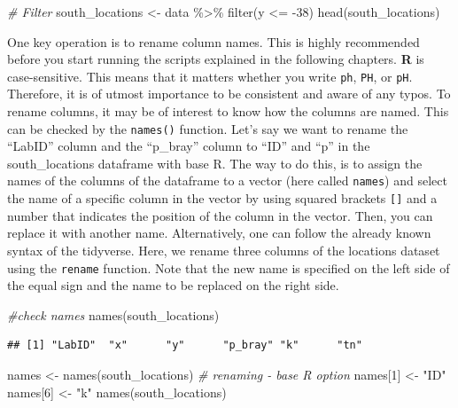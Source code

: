 \documentclass[
  10pt,
  b5paper,
  oneside]{book}
\newenvironment{Shaded}{\begin{snugshade}}{\end{snugshade}}
\newcommand{\CommentTok}[1]{\textcolor[rgb]{0.56,0.35,0.01}{\textit{#1}}}
\newcommand{\DecValTok}[1]{\textcolor[rgb]{0.00,0.00,0.81}{#1}}
\newcommand{\FunctionTok}[1]{\textcolor[rgb]{0.00,0.00,0.00}{#1}}
\newcommand{\NormalTok}[1]{#1}
\newcommand{\OtherTok}[1]{\textcolor[rgb]{0.56,0.35,0.01}{#1}}
\newcommand{\SpecialCharTok}[1]{\textcolor[rgb]{0.00,0.00,0.00}{#1}}
\newcommand{\StringTok}[1]{\textcolor[rgb]{0.31,0.60,0.02}{#1}}
\begin{document}
\begin{Shaded}
\begin{Highlighting}[]
\CommentTok{\# Filter}
\NormalTok{south\_locations }\OtherTok{\textless{}{-}}\NormalTok{ data }\SpecialCharTok{\%\textgreater{}\%} \FunctionTok{filter}\NormalTok{(y }\SpecialCharTok{\textless{}=} \SpecialCharTok{{-}}\DecValTok{38}\NormalTok{)}
\FunctionTok{head}\NormalTok{(south\_locations)}
\end{Highlighting}
\end{Shaded}

One key operation is to rename column names. This is highly recommended before you start running the scripts explained in the following chapters. \textbf{R} is case-sensitive. This means that it matters whether you write \texttt{ph}, \texttt{PH}, or \texttt{pH}. Therefore, it is of utmost importance to be consistent and aware of any typos. To rename columns, it may be of interest to know how the columns are named. This can be checked by the \texttt{names()} function.
Let's say we want to rename the ``LabID'' column and the ``p\_bray'' column to ``ID'' and ``p'' in the south\_locations dataframe with base R. The way to do this, is to assign the names of the columns of the dataframe to a vector (here called \texttt{names}) and select the name of a specific column in the vector by using squared brackets \texttt{{[}{]}} and a number that indicates the position of the column in the vector. Then, you can replace it with another name.
Alternatively, one can follow the already known syntax of the tidyverse. Here, we rename three columns of the locations dataset using the \texttt{rename} function. Note that the new name is specified on the left side of the equal sign and the name to be replaced on the right side.

\begin{Shaded}
\begin{Highlighting}[]
\CommentTok{\#check names}
\FunctionTok{names}\NormalTok{(south\_locations)}
\end{Highlighting}
\end{Shaded}

\begin{verbatim}
## [1] "LabID"  "x"      "y"      "p_bray" "k"      "tn"
\end{verbatim}

\begin{Shaded}
\begin{Highlighting}[]
\NormalTok{names }\OtherTok{\textless{}{-}} \FunctionTok{names}\NormalTok{(south\_locations)}
\CommentTok{\# renaming {-} base R option}
\NormalTok{names[}\DecValTok{1}\NormalTok{] }\OtherTok{\textless{}{-}} \StringTok{"ID"}
\NormalTok{names[}\DecValTok{6}\NormalTok{] }\OtherTok{\textless{}{-}} \StringTok{"k"}
\FunctionTok{names}\NormalTok{(south\_locations)}
\end{Highlighting}
\end{Shaded}
\end{document}
